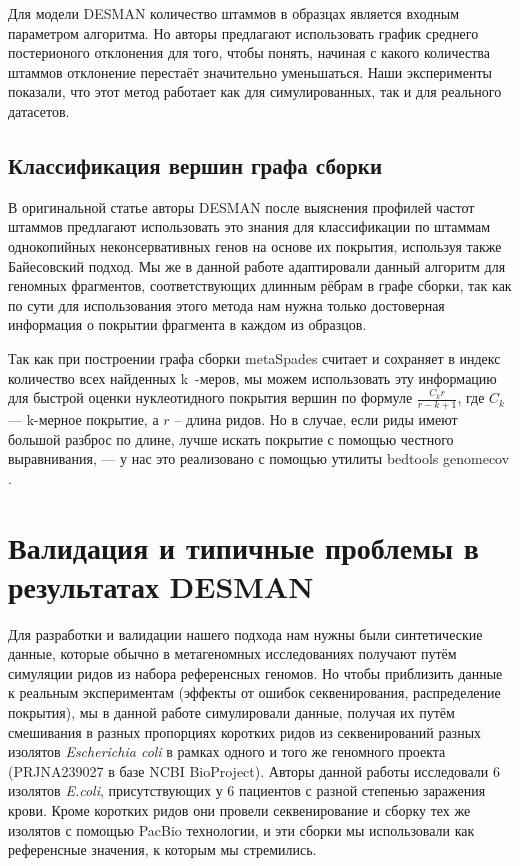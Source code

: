 \documentclass{spbau-diploma}
\begin{document}
Для модели DESMAN количество штаммов в образцах является входным параметром алгоритма. Но авторы предлагают использовать график среднего постерионого отклонения для того, чтобы понять, начиная с какого количества штаммов отклонение перестаёт значительно уменьшаться. Наши эксперименты показали, что этот метод работает как для симулированных, так и для реального датасетов.

\subsection{Классификация вершин графа сборки}

В оригинальной статье авторы DESMAN после выяснения профилей частот штаммов предлагают использовать это знания для классификации по штаммам однокопийных неконсервативных генов на основе их покрытия, используя также Байесовский подход. Мы же в данной работе адаптировали данный алгоритм для геномных фрагментов, соответствующих длинным рёбрам в графе сборки, так как по сути для использования этого метода нам нужна только достоверная информация о покрытии фрагмента в каждом из образцов.

Так как при построении графа сборки metaSpades считает и сохраняет в индекс количество всех найденных k~-меров, мы можем использовать эту информацию для быстрой оценки нуклеотидного покрытия вершин по формуле $\frac{C_k r}{r - k + 1}$, где $C_k$ --- k-мерное покрытие, а $r$ -- длина ридов. Но в случае, если риды имеют большой разброс по длине, лучше искать покрытие с помощью честного выравнивания, --- у нас это реализовано с помощью утилиты bedtools genomecov \cite{bedtools}.


\section{Валидация и типичные проблемы в результатах DESMAN}

Для разработки и валидации нашего подхода нам нужны были синтетические данные, которые обычно в метагеномных исследованиях получают путём симуляции ридов из набора референсных геномов. Но чтобы приблизить данные к реальным экспериментам (эффекты от ошибок секвенирования, распределение покрытия), мы в данной работе симулировали данные, получая их путём смешивания в разных пропорциях коротких ридов из секвенирований разных изолятов \textit{Escherichia coli} в рамках одного и того же геномного проекта (PRJNA239027 в базе NCBI BioProject). Авторы данной работы \cite{isolates} исследовали 6 изолятов \textit{E.coli}, присутствующих у 6 пациентов с разной степенью заражения крови. Кроме коротких ридов они провели секвенирование и сборку тех же изолятов с помощью PacBio технологии, и эти сборки мы использовали как референсные значения, к которым мы стремились. 
\end{document}
